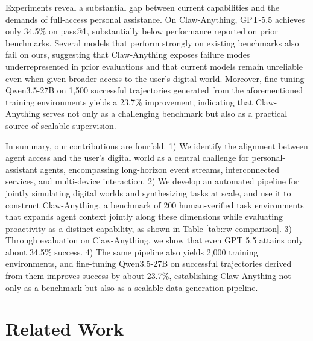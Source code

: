 \documentclass{article}
\begin{document}
Experiments reveal a substantial gap between current capabilities and the demands of full-access personal assistance. On Claw-Anything, GPT-5.5 achieves only 34.5\% on pass@1, substantially below performance reported on prior benchmarks. Several models that perform strongly on existing benchmarks also fail on ours, suggesting that Claw-Anything exposes failure modes underrepresented in prior evaluations and that current models remain unreliable even when given broader access to the user's digital world. Moreover, fine-tuning Qwen3.5-27B on 1,500 successful trajectories generated from the aforementioned training environments yields a 23.7\% improvement, indicating that Claw-Anything serves not only as a challenging benchmark but also as a practical source of scalable supervision.

In summary, our contributions are fourfold. 1) We identify the alignment between agent access and the user's digital world as a central challenge for personal-assistant agents, encompassing long-horizon event streams, interconnected services, and multi-device interaction. 2) We develop an automated pipeline for jointly simulating digital worlds and synthesizing tasks at scale, and use it to construct Claw-Anything, a benchmark of 200 human-verified task environments that expands agent context jointly along these dimensions while evaluating proactivity as a distinct capability, as shown in Table \ref{tab:rw-comparison}. 3) Through evaluation on Claw-Anything, we show that even GPT 5.5 attains only about 34.5\% success. 4) The same pipeline also yields 2,000 training environments, and fine-tuning Qwen3.5-27B on successful trajectories derived from them improves success by about 23.7\%, establishing Claw-Anything not only as a benchmark but also as a scalable data-generation pipeline.


\section{Related Work}
\label{sec:related}
\end{document}
